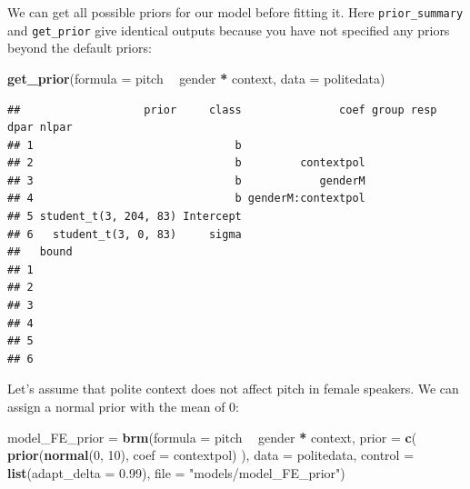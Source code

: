 \documentclass[]{book}
\newenvironment{Shaded}{\begin{snugshade}}{\end{snugshade}}
\newcommand{\DataTypeTok}[1]{\textcolor[rgb]{0.13,0.29,0.53}{#1}}
\newcommand{\DecValTok}[1]{\textcolor[rgb]{0.00,0.00,0.81}{#1}}
\newcommand{\FloatTok}[1]{\textcolor[rgb]{0.00,0.00,0.81}{#1}}
\newcommand{\KeywordTok}[1]{\textcolor[rgb]{0.13,0.29,0.53}{\textbf{#1}}}
\newcommand{\NormalTok}[1]{#1}
\newcommand{\OperatorTok}[1]{\textcolor[rgb]{0.81,0.36,0.00}{\textbf{#1}}}
\newcommand{\StringTok}[1]{\textcolor[rgb]{0.31,0.60,0.02}{#1}}
\begin{document}
We can get all possible priors for our model before fitting it. Here \texttt{prior\_summary} and \texttt{get\_prior} give identical outputs because you have not specified any priors beyond the default priors:

\begin{Shaded}
\begin{Highlighting}[]
\KeywordTok{get_prior}\NormalTok{(}\DataTypeTok{formula =}\NormalTok{ pitch }\OperatorTok{~}\StringTok{ }\NormalTok{gender }\OperatorTok{*}\StringTok{ }\NormalTok{context,}
          \DataTypeTok{data =}\NormalTok{ politedata)}
\end{Highlighting}
\end{Shaded}

\begin{verbatim}
##                   prior     class               coef group resp dpar nlpar
## 1                               b                                         
## 2                               b         contextpol                      
## 3                               b            genderM                      
## 4                               b genderM:contextpol                      
## 5 student_t(3, 204, 83) Intercept                                         
## 6   student_t(3, 0, 83)     sigma                                         
##   bound
## 1      
## 2      
## 3      
## 4      
## 5      
## 6
\end{verbatim}

Let's assume that polite context does not affect pitch in female speakers. We can assign a normal prior with the mean of 0:

\begin{Shaded}
\begin{Highlighting}[]
\NormalTok{model_FE_prior =}\StringTok{ }\KeywordTok{brm}\NormalTok{(}\DataTypeTok{formula =}\NormalTok{ pitch }\OperatorTok{~}\StringTok{ }\NormalTok{gender }\OperatorTok{*}\StringTok{ }\NormalTok{context,}
                     \DataTypeTok{prior =} \KeywordTok{c}\NormalTok{(}
                       \KeywordTok{prior}\NormalTok{(}\KeywordTok{normal}\NormalTok{(}\DecValTok{0}\NormalTok{, }\DecValTok{10}\NormalTok{), }\DataTypeTok{coef =}\NormalTok{ contextpol)}
\NormalTok{                       ),}
                     \DataTypeTok{data =}\NormalTok{ politedata,}
                     \DataTypeTok{control =} \KeywordTok{list}\NormalTok{(}\DataTypeTok{adapt_delta =} \FloatTok{0.99}\NormalTok{),}
                     \DataTypeTok{file =} \StringTok{"models/model_FE_prior"}\NormalTok{)}
\end{Highlighting}
\end{Shaded}
\end{document}
